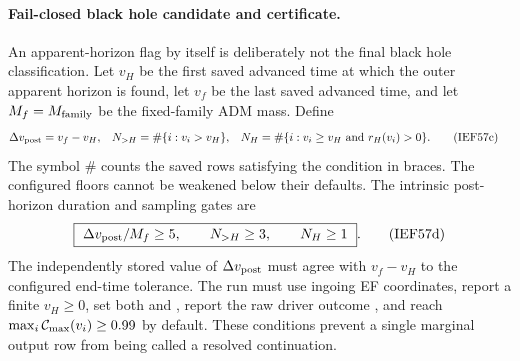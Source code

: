 \paragraph{Fail-closed black hole candidate and certificate.}
An apparent-horizon flag by itself is deliberately not the final
black hole classification.  Let \(v_H\) be the first saved advanced time at
which the outer apparent horizon is found, let \(v_f\) be the last saved
advanced time, and let \(M_f=M_{\rm family}\) be the fixed-family ADM mass.
Define
\begin{align}
 \Delta v_{\rm post}&=v_f-v_H,&
 N_{>H}&=\#\{i:v_i>v_H\},&
 N_H&=\#\{i:v_i\ge v_H\ \hbox{and}\ r_H(v_i)>0\}.
                                                               \tag{IEF57c}
\end{align}
The symbol \(\#\) counts the saved rows satisfying the condition in braces.
The configured floors cannot be weakened below their defaults.  The intrinsic
post-horizon duration and sampling gates are
\[
 \boxed{\ \Delta v_{\rm post}/M_f\ge5,\qquad N_{>H}\ge3,
         \qquad N_H\ge1\ }.                            \tag{IEF57d}
\]
The independently stored value of \(\Delta v_{\rm post}\) must agree with
\(v_f-v_H\) to the configured end-time tolerance.  The run must use ingoing
EF coordinates, report a finite \(v_H\ge0\), set both
 and , report the raw driver
outcome , and reach
\(\max_i{\cal C}_{\max}(v_i)\ge0.99\) by default.  These conditions prevent
a single marginal output row from being called a resolved continuation.

